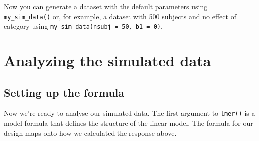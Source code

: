 \documentclass[english,doc,floatsintext]{apa6}
\newenvironment{Shaded}{\begin{snugshade}}{\end{snugshade}}
\newcommand{\DataTypeTok}[1]{\textcolor[rgb]{0.13,0.29,0.53}{#1}}
\newcommand{\DecValTok}[1]{\textcolor[rgb]{0.00,0.00,0.81}{#1}}
\newcommand{\KeywordTok}[1]{\textcolor[rgb]{0.13,0.29,0.53}{\textbf{#1}}}
\newcommand{\NormalTok}[1]{#1}
\newcommand{\OperatorTok}[1]{\textcolor[rgb]{0.81,0.36,0.00}{\textbf{#1}}}
\newcommand{\StringTok}[1]{\textcolor[rgb]{0.31,0.60,0.02}{#1}}
\begin{document}
\begin{Shaded}
\end{Shaded}

Now you can generate a dataset with the default parameters using \texttt{my\_sim\_data()} or, for example, a dataset with 500 subjects and no effect of category using \texttt{my\_sim\_data(nsubj\ =\ 50,\ b1\ =\ 0)}.

\hypertarget{analyzing-the-simulated-data}{%
\section{Analyzing the simulated data}\label{analyzing-the-simulated-data}}

\hypertarget{setting-up-the-formula}{%
\subsection{Setting up the formula}\label{setting-up-the-formula}}

Now we're ready to analyse our simulated data. The first argument to \texttt{lmer()} is a model formula that defines the structure of the linear model. The formula for our design maps onto how we calculated the response above.
\end{document}
